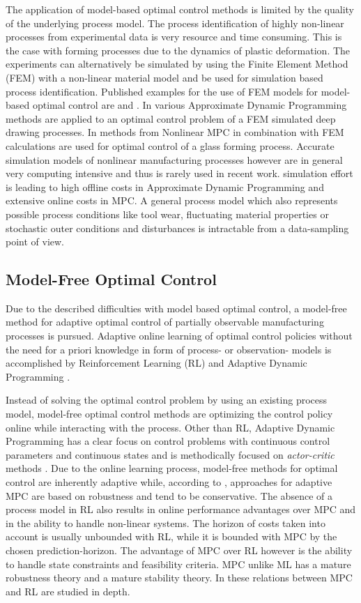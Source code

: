 The application of model-based optimal control methods is limited by the quality of the underlying process model. The process identification of highly non-linear processes from experimental data is very resource and time consuming. This is the case with forming processes due to the dynamics of plastic deformation. The experiments can alternatively be simulated by using the Finite Element Method (FEM) with a non-linear material model and be used for simulation based process identification. Published examples for the use of FEM models for model-based optimal control are \cite{Senn2014} and \cite{Bernard2006}. In \cite{Senn2014} various Approximate Dynamic Programming methods are applied to an optimal control problem of a FEM simulated deep drawing processes. In \cite{Bernard2006} methods from Nonlinear MPC in combination with FEM calculations are used for optimal control of a glass forming process. Accurate simulation models of nonlinear manufacturing processes however are in general very computing intensive and thus is rarely used in recent work. simulation effort is leading to high offline costs in Approximate Dynamic Programming and extensive online costs in MPC. A general process model which also represents possible process conditions like tool wear, fluctuating material properties or stochastic outer conditions and disturbances is intractable from a data-sampling point of view.

\subsection{Model-Free Optimal Control}
\label{introRL}

Due to the described difficulties with model based optimal control, a model-free method for adaptive optimal control of partially observable manufacturing processes is pursued. Adaptive online learning of optimal control policies without the need for a priori knowledge in form of process- or observation- models is accomplished by Reinforcement Learning (RL) \cite{Sutton1998} and Adaptive Dynamic Programming \cite{Wang2009}. 

Instead of solving the optimal control problem by using an existing process model, model-free optimal control methods are optimizing the control policy online while interacting with the process. Other than RL, Adaptive Dynamic Programming has a clear focus on control problems with continuous control parameters and continuous states and is methodically focused on \textit{actor-critic} methods \cite{Szuster2018}. Due to the online learning process, model-free methods for optimal control are inherently adaptive while, according to \cite{Gorges2017}, approaches for adaptive MPC are based on robustness and tend to be conservative. The absence of a process model in RL also results in online performance advantages over MPC and in the ability to handle non-linear systems. The horizon of costs taken into account is usually unbounded with RL, while it is bounded with MPC by the chosen prediction-horizon. The advantage of MPC over RL however is the ability to handle state constraints and feasibility criteria. MPC unlike ML has a mature robustness theory and a mature stability theory. In \cite{Gorges2017} these relations between MPC and RL are studied in depth. 


